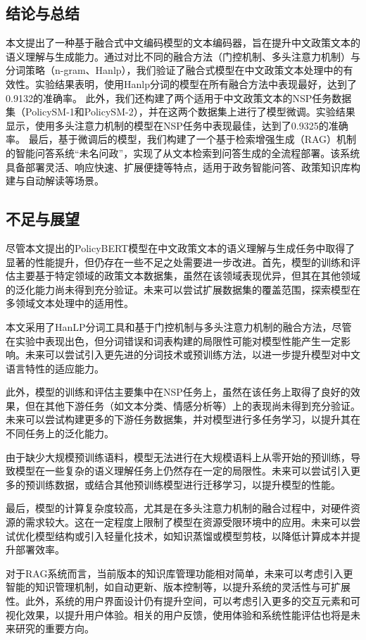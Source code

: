 \documentclass[12pt, a4paper]{ctexart}
\begin{document}
\subsection{结论与总结}
本文提出了一种基于融合式中文编码模型的文本编码器，旨在提升中文政策文本的语义理解与生成能力。通过对比不同的融合方法（门控机制、多头注意力机制）与分词策略（n-gram、Hanlp），我们验证了融合式模型在中文政策文本处理中的有效性。实验结果表明，使用Hanlp分词的模型在所有融合方法中表现最好，达到了0.9132的准确率。
此外，我们还构建了两个适用于中文政策文本的NSP任务数据集（PolicySM-1和PolicySM-2），并在这两个数据集上进行了模型微调。实验结果显示，使用多头注意力机制的模型在NSP任务中表现最佳，达到了0.9325的准确率。
最后，基于微调后的模型，我们构建了一个基于检索增强生成（RAG）机制的智能问答系统“未名问政”，实现了从文本检索到问答生成的全流程部署。该系统具备部署灵活、响应快速、扩展便捷等特点，适用于政务智能问答、政策知识库构建与自动解读等场景。

\subsection{不足与展望}
尽管本文提出的PolicyBERT模型在中文政策文本的语义理解与生成任务中取得了显著的性能提升，但仍存在一些不足之处需要进一步改进。首先，模型的训练和评估主要基于特定领域的政策文本数据集，虽然在该领域表现优异，但其在其他领域的泛化能力尚未得到充分验证。未来可以尝试扩展数据集的覆盖范围，探索模型在多领域文本处理中的适用性。

本文采用了HanLP分词工具和基于门控机制与多头注意力机制的融合方法，尽管在实验中表现出色，但分词错误和词表构建的局限性可能对模型性能产生一定影响。未来可以尝试引入更先进的分词技术或预训练方法，以进一步提升模型对中文语言特性的适应能力。

此外，模型的训练和评估主要集中在NSP任务上，虽然在该任务上取得了良好的效果，但在其他下游任务（如文本分类、情感分析等）上的表现尚未得到充分验证。未来可以尝试构建更多的下游任务数据集，并对模型进行多任务学习，以提升其在不同任务上的泛化能力。

由于缺少大规模预训练语料，模型无法进行在大规模语料上从零开始的预训练，导致模型在一些复杂的语义理解任务上仍然存在一定的局限性。未来可以尝试引入更多的预训练数据，或结合其他预训练模型进行迁移学习，以提升模型的性能。

最后，模型的计算复杂度较高，尤其是在多头注意力机制的融合过程中，对硬件资源的需求较大。这在一定程度上限制了模型在资源受限环境中的应用。未来可以尝试优化模型结构或引入轻量化技术，如知识蒸馏或模型剪枝，以降低计算成本并提升部署效率。

对于RAG系统而言，当前版本的知识库管理功能相对简单，未来可以考虑引入更智能的知识管理机制，如自动更新、版本控制等，以提升系统的灵活性与可扩展性。此外，系统的用户界面设计仍有提升空间，可以考虑引入更多的交互元素和可视化效果，以提升用户体验。相关的用户反馈，使用体验和系统性能评估也将是未来研究的重要方向。
\end{document}
